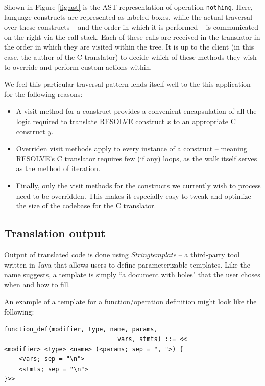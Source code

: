 \documentclass{sig-alternate}
\begin{document}
Shown in Figure \ref{fig:ast} is the AST representation of operation \texttt{nothing}. Here, language constructs are represented as labeled boxes, while the actual traversal over these constructs -- and the order in which it is performed -- is communicated on the right via the call stack. Each of these calls are received in the translator in the order in which they are visited within the tree. It is up to the client (in this case, the author of the C-translator) to decide which of these methods they wish to override and perform custom actions within. 

We feel this particular traversal pattern lends itself well to the this application for the following reasons:

\begin{itemize}
\item A visit method for a construct provides a convenient encapsulation of all the logic required to translate RESOLVE construct $x$ to an appropriate C construct $y$.

\item Overriden visit methods apply to every instance of a construct -- meaning RESOLVE's C translator requires few (if any) loops, as the walk itself serves as the method of iteration.

\item Finally, only the visit methods for the constructs we currently wish to process need to be overridden. This makes it especially easy to tweak and optimize the size of the codebase for the C translator.
\end{itemize}

\subsection{Translation output}
Output of translated code is done using \textit{Stringtemplate} -- a third-party tool written in Java that allows users to define parameterizable templates. Like the name suggests, a template is simply ``a document with holes" that the user choses when and how to fill. 

An example of a template for a function/operation definition might look like the following:

\begin{verbatim}
function_def(modifier, type, name, params, 
                               vars, stmts) ::= <<
<modifier> <type> <name> (<params; sep = ", ">) {
    <vars; sep = "\n">
    <stmts; sep = "\n">
}>>
\end{verbatim}
\end{document}
